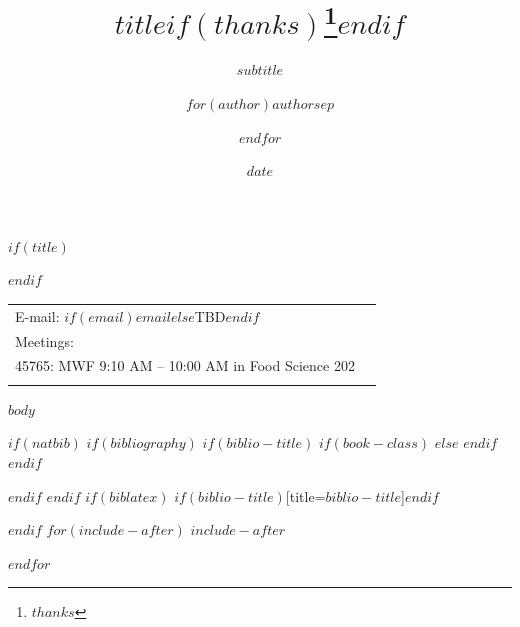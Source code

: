\documentclass[$if(fontsize)$$fontsize$,$endif$$if(lang)$$babel-lang$,$endif$$if(papersize)$$papersize$,$endif$$for(classoption)$$classoption$$sep$,$endfor$]{article}
\title{$title$$if(thanks)$\thanks{$thanks$}$endif$}
\subtitle{$subtitle$}
\author{$for(author)$$author$$sep$ \and $endfor$}
\date{$date$}
\theoremstyle{warning}
\begin{document}
  

	$if(title)$
	\maketitle
	$endif$
	
	
		\thispagestyle{firststyle}



	\noindent \begin{tabular*}{\textwidth}{ @{\extracolsep{\fill}} lr @{\extracolsep{\fill}}}

  E-mail: $if(email)$\texttt{$email$}$else$TBD$endif$ &  \\
  \vspace{0.2em}
  Meetings: & \\
  \hspace{1em} 45765: MWF 9:10 AM -- 10:00 AM in Food Science 202 \\
  &  \\
  \hline
	\end{tabular*}
	

\tableofcontents

\newpage


$body$




$if(natbib)$
$if(bibliography)$
$if(biblio-title)$
$if(book-class)$
\renewcommand\bibname{$biblio-title$}
$else$
\renewcommand\refname{$biblio-title$}
$endif$
$endif$


$endif$
$endif$
$if(biblatex)$
\printbibliography$if(biblio-title)$[title=$biblio-title$]$endif$




$endif$
$for(include-after)$
$include-after$

$endfor$
\end{document}
